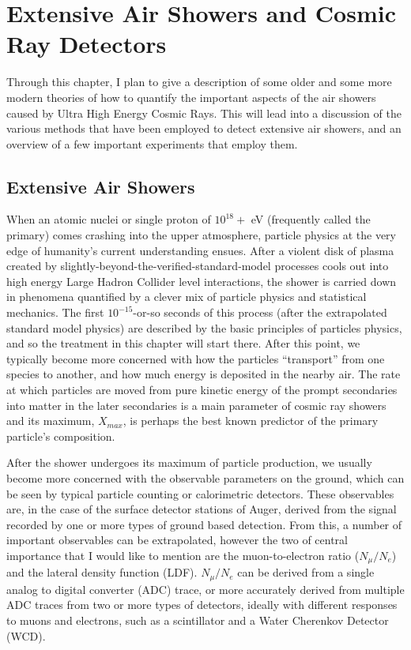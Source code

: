 
\chapter{Extensive Air Showers and Cosmic Ray Detectors} %
Through this chapter, I plan to give a description of some older and some more modern theories of how to quantify the important aspects of the air showers caused by Ultra High Energy Cosmic Rays. This will lead into a discussion of the various methods that have been employed to detect extensive air showers, and an overview of a few important experiments that employ them.
\section{Extensive Air Showers}
When an atomic nuclei or single proton of $10^{18}+$ eV (frequently called the primary) comes crashing into the upper atmosphere, particle physics at the very edge of humanity's current understanding ensues. After a violent disk of plasma created by slightly-beyond-the-verified-standard-model processes cools out into high energy Large Hadron Collider level interactions, the shower is carried down in phenomena quantified by a clever mix of particle physics and statistical mechanics. The first $10^{-15}$-or-so seconds of this process (after the extrapolated standard model physics) are described by the basic principles of particles physics, and so the treatment in this chapter will start there. After this point, we typically become more concerned with how the particles ``transport'' from one species to another, and how much energy is deposited in the nearby air. The rate at which particles are moved from pure kinetic energy of the prompt secondaries into matter in the later secondaries is a main parameter of cosmic ray showers and its maximum, $X_{max}$, is perhaps the best known predictor of the primary particle's composition.

After the shower undergoes its maximum of particle production, we usually become more concerned with the observable parameters on the ground, which can be seen by typical particle counting or calorimetric detectors. These observables are, in the case of the surface detector stations of Auger, derived from the signal recorded by one or more types of ground based detection. From this, a number of important observables can be extrapolated, however the two of central importance that I would like to mention are the muon-to-electron ratio ($N_{\mu}/N_e$) and the lateral density function (LDF). $N_{\mu}/N_e$ can be derived from a single analog to digital converter (ADC) trace, or more accurately derived from multiple ADC traces from two or more types of detectors, ideally with different responses to muons and electrons, such as a scintillator and a Water Cherenkov Detector (WCD).

